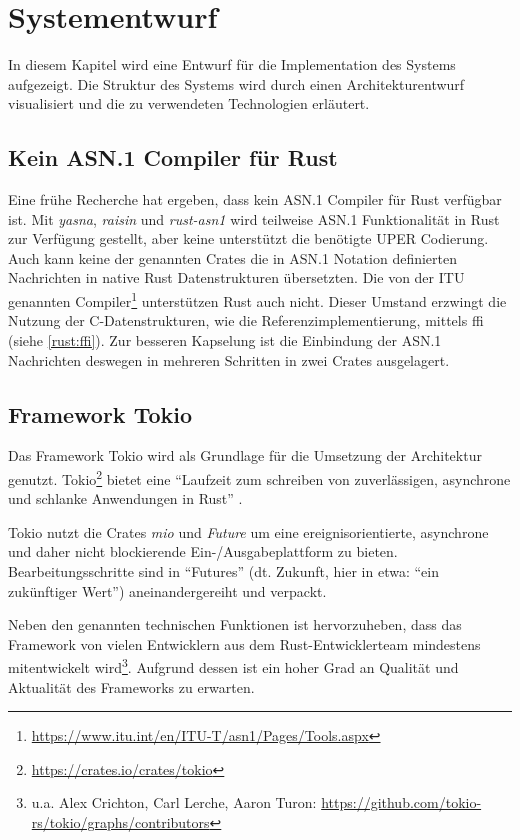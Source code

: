 
\chapter{Systementwurf}

In diesem Kapitel wird eine Entwurf für die Implementation des Systems aufgezeigt.
Die Struktur des Systems wird durch einen Architekturentwurf visualisiert und die zu verwendeten Technologien erläutert.

\section{Kein ASN.1 Compiler für Rust}

Eine frühe Recherche hat ergeben, dass kein ASN.1 Compiler für Rust verfügbar ist.
Mit \textit{yasna}, \textit{raisin} und \textit{rust-asn1} wird teilweise ASN.1 Funktionalität in Rust zur Verfügung gestellt, aber keine unterstützt die benötigte UPER Codierung.
Auch kann keine der genannten Crates die in ASN.1 Notation definierten Nachrichten in native Rust Datenstrukturen übersetzten.
Die von der ITU genannten Compiler\footnote{\url{https://www.itu.int/en/ITU-T/asn1/Pages/Tools.aspx}} unterstützen Rust auch nicht.
Dieser Umstand erzwingt die Nutzung der C-Datenstrukturen, wie die Referenzimplementierung, mittels \gls{ffi} (siehe \autoref{rust:ffi}).
Zur besseren Kapselung ist die Einbindung der ASN.1 Nachrichten deswegen in mehreren Schritten in zwei Crates ausgelagert.

\section{Framework Tokio}
\label{design:tokio}

Das Framework Tokio wird als Grundlage für die Umsetzung der Architektur genutzt.
Tokio\footnote{\url{https://crates.io/crates/tokio}} bietet eine \enquote{Laufzeit zum schreiben von zuverlässigen, asynchrone und schlanke Anwendungen in Rust} \cite{rust:crate:tokio}.

Tokio nutzt die Crates \textit{mio} und \textit{Future} um eine ereignisorientierte, asynchrone und daher nicht blockierende Ein-/Ausgabeplattform zu bieten.
Bearbeitungsschritte sind in \enquote{Futures} (dt. Zukunft, hier in etwa: \enquote{ein zukünftiger Wert}) aneinandergereiht und verpackt.

Neben den genannten technischen Funktionen ist hervorzuheben, dass das Framework von vielen Entwicklern aus dem Rust-Entwicklerteam mindestens mitentwickelt wird\footnote{u.a. Alex Crichton, Carl Lerche, Aaron Turon: \url{https://github.com/tokio-rs/tokio/graphs/contributors}}.
Aufgrund dessen ist ein hoher Grad an Qualität und Aktualität des Frameworks zu erwarten.

